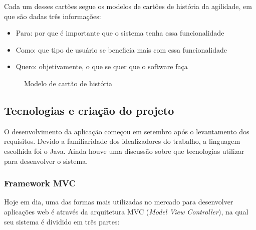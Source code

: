 Cada um desses cartões segue os modelos de cartões de história da agilidade, em que são dadas três informações:

\begin{itemize}
	\item Para: por que é importante que o sistema tenha essa funcionalidade
	\item Como: que tipo de usuário se beneficia mais com essa funcionalidade
	\item Quero: objetivamente, o que se quer que o software faça
\end{itemize}

\begin{figure}[H]
  \hspace*{-4em}
  \caption{Modelo de cartão de história}\label{figura:cartao}
\end{figure}

\subsection{Tecnologias e criação do projeto}

O desenvolvimento da aplicação começou em setembro após o levantamento dos requisitos. Devido a familiaridade dos idealizadores do trabalho, a linguagem escolhida foi o Java. Ainda houve uma discussão sobre que tecnologias utilizar para desenvolver o sistema.

\subsubsection*{Framework MVC}

Hoje em dia, uma das formas mais utilizadas no mercado para desenvolver aplicações web é através da arquitetura MVC (\textit{Model View Controller}), na qual seu sistema é dividido em três partes:

